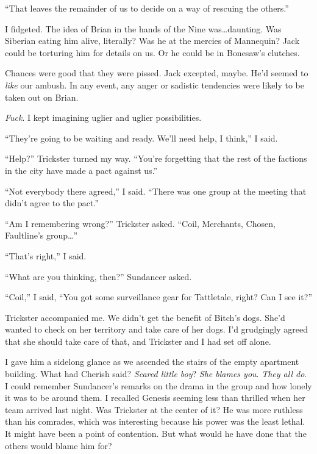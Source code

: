 ``That leaves the remainder of us to decide on a way of rescuing the others.''



I fidgeted.  The idea of Brian in the hands of the Nine was\ldots daunting.  Was Siberian eating him alive, literally?  Was he at the mercies of Mannequin?  Jack could be torturing him for details on us.  Or he could be in Bonesaw's clutches.



Chances were good that they were pissed.  Jack excepted, maybe.  He'd seemed to \emph{like} our ambush.  In any event, any anger or sadistic tendencies were likely to be taken out on Brian.



\emph{Fuck}.  I kept imagining uglier and uglier possibilities.



``They're going to be waiting and ready.  We'll need help, I think,'' I said.



``Help?'' Trickster turned my way.  ``You're forgetting that the rest of the factions in the city have made a pact against us.''



``Not everybody there agreed,'' I said.  ``There was one group at the meeting that didn't agree to the pact.''



``Am I remembering wrong?''  Trickster asked.  ``Coil, Merchants, Chosen, Faultline's group\ldots''



``That's right,'' I said.



``What are you thinking, then?''  Sundancer asked.



``Coil,'' I said, ``You got some surveillance gear for Tattletale, right?  Can I see it?''



\sectionbreak



Trickster accompanied me.  We didn't get the benefit of Bitch's dogs.  She'd wanted to check on her territory and take care of her dogs.  I'd grudgingly agreed that she should take care of that, and Trickster and I had set off alone.



I gave him a sidelong glance as we ascended the stairs of the empty apartment building.  What had Cherish said?  \emph{Scared little boy}?  \emph{She blames you}.  \emph{They all do}.  I could remember Sundancer's remarks on the drama in the group and how lonely it was to be around them.  I recalled Genesis seeming less than thrilled when her team arrived last night.  Was Trickster at the center of it?  He was more ruthless than his comrades, which was interesting because his power was the least lethal.  It might have been a point of contention.  But what would he have done that the others would blame him for?



